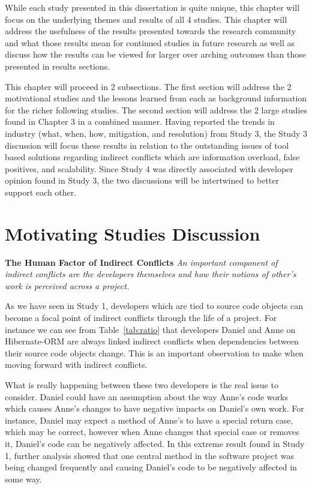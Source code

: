 \label{chapter:discussion}

While each study presented in this dissertation is quite unique, this chapter will focus on the underlying themes and
results of all 4 studies. This chapter will address the usefulness of the results presented towards the
research community and
what those results mean for continued studies in future research as well as discuss how the results can be viewed
for larger over arching outcomes than those presented in results sections. 

This chapter will proceed in 2 subsections. The first section will address the 2 motivational studies and the lessons
learned from each as background information for the richer following studies. The second section will address the 2 large
studies found in Chapter 3 in a combined manner. Having reported the trends in industry (what, when, how, mitigation, and resolution)
from Study 3, the Study 3 discussion will focus these
results in relation to the outstanding issues of tool based solutions regarding indirect conflicts which are information overload,
false positives, and scalability. Since Study 4 was directly associated with developer opinion found in Study
3, the two discussions will be intertwined to better support each other.

\section{Motivating Studies Discussion}

\textbf{The Human Factor of Indirect Conflicts} \textit{An important component of indirect conflicts are the developers
themselves and how their notions of other's work is perceived across a project.}

As we have seen in Study 1, developers which are tied to source code objects can become a focal point of
indirect conflicts through the life of a project. For instance we can see from Table~\ref{tab:ratio} that
developers Daniel and Anne on Hibernate-ORM are always linked indirect conflicts when dependencies between
their source code objects change. This is an important observation to make when moving forward with indirect
conflicts.

What is really happening between these two developers is the real issue to consider. Daniel could have an
assumption about the way Anne's code works which causes Anne's changes to have negative impacts on Daniel's
own work. For instance, Daniel may expect a method of Anne's to have a special return case, which may be correct,
however when Anne changes that special case or removes it, Daniel's code can be negatively affected. In this extreme
result found in Study 1, further analysis showed that one central method in the software project was being changed
frequently and causing Daniel's code to be negatively affected in some way.

